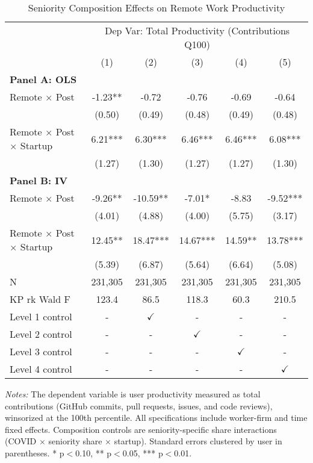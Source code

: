 \documentclass[11pt]{article}
\begin{document}
\begin{table}[H]
\centering
\caption{Seniority Composition Effects on Remote Work Productivity}
\label{tab:seniority_composition}
\begin{tabular}{l*{5}{c}}
\toprule
 & \multicolumn{5}{c}{Dep Var: Total Productivity (Contributions Q100)} \\
\cmidrule{2-6}
 & (1) & (2) & (3) & (4) & (5) \\
\midrule
\multicolumn{6}{l}{\textbf{Panel A: OLS}} \\
\addlinespace
Remote $\times$ Post & -1.23** & -0.72 & -0.76 & -0.69 & -0.64 \\
 & (0.50) & (0.49) & (0.48) & (0.49) & (0.48) \\
\addlinespace[0.5em]
Remote $\times$ Post $\times$ Startup & 6.21*** & 6.30*** & 6.46*** & 6.46*** & 6.08*** \\
 & (1.27) & (1.30) & (1.27) & (1.27) & (1.30) \\

\midrule
\multicolumn{6}{l}{\textbf{Panel B: IV}} \\
\addlinespace
Remote $\times$ Post & -9.26** & -10.59** & -7.01* & -8.83 & -9.52*** \\
 & (4.01) & (4.88) & (4.00) & (5.75) & (3.17) \\
\addlinespace[0.5em]
Remote $\times$ Post $\times$ Startup & 12.45** & 18.47*** & 14.67*** & 14.59** & 13.78*** \\
 & (5.39) & (6.87) & (5.64) & (6.64) & (5.08) \\

\midrule
N & 231,305 & 231,305 & 231,305 & 231,305 & 231,305 \\
KP rk Wald F & 123.4 & 86.5 & 118.3 & 60.3 & 210.5 \\

\midrule
Level 1 control & - & $\checkmark$ & - & - & - \\
Level 2 control & - & - & $\checkmark$ & - & - \\
Level 3 control & - & - & - & $\checkmark$ & - \\
Level 4 control & - & - & - & - & $\checkmark$ \\
\bottomrule
\end{tabular}
\begin{tablenotes}
\small
\item \textit{Notes:} The dependent variable is user productivity measured as total contributions (GitHub commits, pull requests, issues, and code reviews), winsorized at the 100th percentile. 
All specifications include worker-firm and time fixed effects. 
Composition controls are seniority-specific share interactions (COVID $\times$ seniority share $\times$ startup).
Standard errors clustered by user in parentheses. 
* p$<$0.10, ** p$<$0.05, *** p$<$0.01.
\end{tablenotes}
\end{table}
\end{document}
